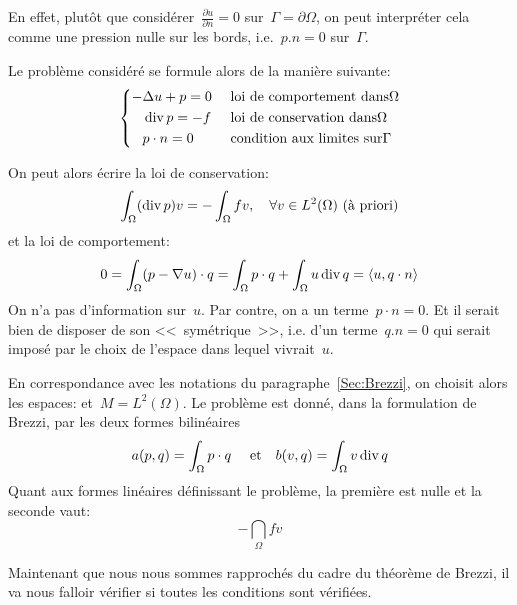 En effet, plutôt que considérer~$\frac{\partial u}{\partial n}=0$ sur~$\Gamma=\partial\Omega$,
on peut interpréter cela comme une pression nulle sur les bords, i.e.~$p.n=0$ sur~$\Gamma$.

\medskip
Le problème considéré se formule alors de la manière suivante:
\begin{equation}\left\{
\begin{aligned}
-&\Delta u +p =0 && \text{ loi de comportement dans} \Omega\\
&\operatorname{div} p = -f && \text{ loi de conservation dans} \Omega\\
& p\cdot n=0 && \text{ condition aux limites sur}\Gamma
\end{aligned}
\right.
\end{equation}

On peut alors écrire la loi de conservation:
\begin{equation}
\displaystyle\int_\Omega (\operatorname{div} p) v = -\displaystyle\int_\Omega fv,\quad \forall v\in L^2(\Omega) \text{ (à priori)}
\end{equation}
et la loi de comportement:
\begin{equation}
0=\displaystyle\int_\Omega (p-\nabla u)\cdot q = \displaystyle\int_\Omega p\cdot q + \displaystyle\int_\Omega u \operatorname{div} q=\langle u,q\cdot n\rangle
\end{equation}
On n'a pas d'information sur~$u$.
Par contre, on a un terme~$p\cdot n=0$.
Et il serait bien de disposer de son <<~symétrique~>>, i.e. d'un terme~$q.n=0$ qui serait imposé
par le choix de l'espace dans lequel vivrait~$u$.

\medskip
En correspondance avec les notations du paragraphe~\ref{Sec:Brezzi}, on choisit alors les espaces:
et~$M=L^2(\Omega)$.
Le problème est donné, dans la formulation de Brezzi,
par les deux formes bilinéaires
\begin{equation}a(p,q)=\displaystyle\int_\Omega p\cdot q\quad\text{ et}\quad b(v,q)=\displaystyle\int_\Omega v\operatorname{div} q\end{equation}
Quant aux formes linéaires définissant le problème, la première est nulle et la
seconde vaut:\begin{equation}-\dint_\Omega fv\end{equation}

\medskip
Maintenant que nous nous sommes rapprochés du cadre du théorème de Brezzi,
il va nous falloir vérifier si toutes les conditions sont vérifiées.

